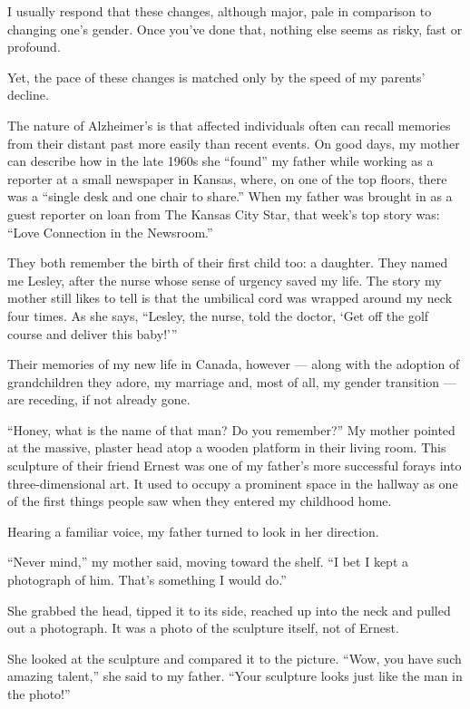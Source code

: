 I usually respond that these changes, although major, pale in comparison
to changing one's gender. Once you've done that, nothing else seems as
risky, fast or profound.

Yet, the pace of these changes is matched only by the speed of my
parents' decline.

The nature of Alzheimer's is that affected individuals often can recall
memories from their distant past more easily than recent events. On good
days, my mother can describe how in the late 1960s she ``found'' my
father while working as a reporter at a small newspaper in Kansas,
where, on one of the top floors, there was a ``single desk and one chair
to share.'' When my father was brought in as a guest reporter on loan
from The Kansas City Star, that week's top story was: ``Love Connection
in the Newsroom.''

They both remember the birth of their first child too: a daughter. They
named me Lesley, after the nurse whose sense of urgency saved my life.
The story my mother still likes to tell is that the umbilical cord was
wrapped around my neck four times. As she says, ``Lesley, the nurse,
told the doctor, `Get off the golf course and deliver this baby!'''

Their memories of my new life in Canada, however --- along with the
adoption of grandchildren they adore, my marriage and, most of all, my
gender transition --- are receding, if not already gone.

``Honey, what is the name of that man? Do you remember?'' My mother
pointed at the massive, plaster head atop a wooden platform in their
living room. This sculpture of their friend Ernest was one of my
father's more successful forays into three-dimensional art. It used to
occupy a prominent space in the hallway as one of the first things
people saw when they entered my childhood home.

Hearing a familiar voice, my father turned to look in her direction.

``Never mind,'' my mother said, moving toward the shelf. ``I bet I kept
a photograph of him. That's something I would do.''

She grabbed the head, tipped it to its side, reached up into the neck
and pulled out a photograph. It was a photo of the sculpture itself, not
of Ernest.

She looked at the sculpture and compared it to the picture. ``Wow, you
have such amazing talent,'' she said to my father. ``Your sculpture
looks just like the man in the photo!''

